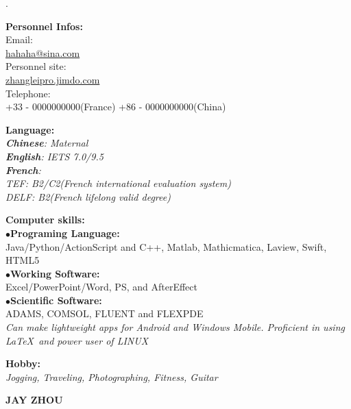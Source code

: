 \documentclass[a4paper,12pt,final]{memoir}
\newcommand{\myThemeColor}{Maroon}
\newcommand{\SmallSep}{\vspace{0.9em}}
\newcommand{\CVItem}[1]
	{\textbf{\color{\myThemeColor} #1}}
\begin{document}
\begin{flushright}\footnotesize
.\\
\vskip 6cm
    \raggedright
	\CVItem{{\large Personnel Infos:}}\\
	Email:\\
	\href{mailto:hahaha@sina.com}{hahaha@sina.com}  \\
	Personnel site:\\
	\href{http://zhangleipro.jimdo.com/}{zhangleipro.jimdo.com} \\
	Telephone:\\
	+33 - 0000000000(France)
	+86 - 0000000000(China)
		
	\CVItem{{\large Language:}}\\
	\textit{\textbf{Chinese}: Maternal \\\textbf{English}: IETS 7.0/9.5\\ \textbf{French}:\\ TEF: B2/C2(French international evaluation system)\\DELF: B2(French lifelong valid degree)}
	
	\CVItem{{\large Computer skills:}}\\
	$\bullet$\textbf{Programing Language:}\\ Java/Python/ActionScript and C++, Matlab, Mathicmatica,  Laview, Swift, HTML5\\
	$\bullet$\textbf{Working Software:}\\ Excel/PowerPoint/Word, PS, and AfterEffect \\
	$\bullet$\textbf{Scientific Software:}\\ ADAMS, COMSOL, FLUENT and FLEXPDE \\
	\SmallSep
	\textit{Can make lightweight apps for Android and Windows Mobile. Proficient in using \LaTeX~and power user of LINUX}
	
	\CVItem{{\large Hobby:}}\\
	\textit{Jogging, Traveling, Photographing, Fitness, Guitar}
	\SmallSep
\end{flushright}\normalsize
\framebreak


\Huge\bfseries {\color{\myThemeColor} JAY \textsc{ZHOU}}\\
\normalsize\normalfont
\end{document}
